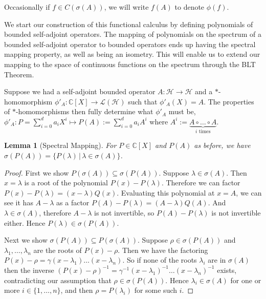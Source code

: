 \documentclass[12pt,oneside]{report}
\newtheorem{lem}[thm]{Lemma}
\begin{document}
Occasionally if $f \in C(\sigma(A))$, we will write $f(A)$ to denote $\phi(f)$.

We start our construction of this functional calculus by defining polynomials of bounded self-adjoint operators. The mapping of polynomials on the spectrum of a bounded self-adjoint operator to bounded operators ends up having the spectral mapping property, as well as being an isometry. This will enable us to extend our mapping to the space of continuous functions on the spectrum through the BLT Theorem.

Suppose we had a self-adjoint bounded operator $A: \mathscr{H} \to \mathscr{H}$ and a $*$-homomorphism $\phi'_{A}: \mathbb{C}[X] \to \mathscr{L}(\mathscr{H})$ such that $\phi'_{A}(X) = A$. The properties of $*$-homomorphisms then fully determine what $\phi'_{A}$ must be, $\phi'_{A}: P = \sum_{i=0}^{d} a_{i} X^{i} \mapsto P(A) := \sum_{i=0}^{d} a_{i} A^{i}$ where $A^{i} := \underbrace{ A \circ \dots \circ A }_{ i \text{ times} }$.

\begin{lem}[Spectral Mapping]\label{spectral-mapping-polyn}
    For $P \in \mathbb{C}[X]$ and $P(A)$ as before, we have $\sigma(P(A)) = \{ P(\lambda) \, | \, \lambda \in \sigma(A) \}$.
\end{lem}
\begin{proof}
    First we show $P(\sigma(A)) \subseteq \sigma(P(A))$. Suppose $\lambda \in \sigma(A)$. Then $x = \lambda$ is a root of the polynomial $P(x) - P(\lambda)$. Therefore we can factor $P(x) - P(\lambda) = (x - \lambda)Q(x)$. Evaluating this polynomial at $x = A$, we can see it has $A - \lambda$ as a factor $P(A) - P(\lambda) = (A - \lambda)Q(A)$. And $\lambda \in \sigma(A)$, therefore $A - \lambda$ is not invertible, so $P(A) - P(\lambda)$ is not invertible either. Hence $P(\lambda) \in \sigma(P(A))$.

    Next we show $\sigma(P(A)) \subseteq P(\sigma(A))$. Suppose $\rho \in \sigma(P(A))$ and $\lambda_{1},\dots,\lambda_{n}$ are the roots of $P(x) - \rho$. Then we have the factoring $P(x) - \rho = \gamma(x - \lambda_{1})\dots(x - \lambda_{n})$. So if none of the roots $\lambda_{i}$ are in $\sigma(A)$ then the inverse $(P(x) - \rho)^{-1} = \gamma^{-1}(x - \lambda_{1})^{-1}\dots(x - \lambda_{n})^{-1}$ exists, contradicting our assumption that $\rho \in \sigma(P(A))$. Hence $\lambda_{i} \in \sigma(A)$ for one or more $i \in \{ 1,\dots,n \}$, and then $\rho = P(\lambda_{i})$ for some such $i$.
\end{proof}
\end{document}

